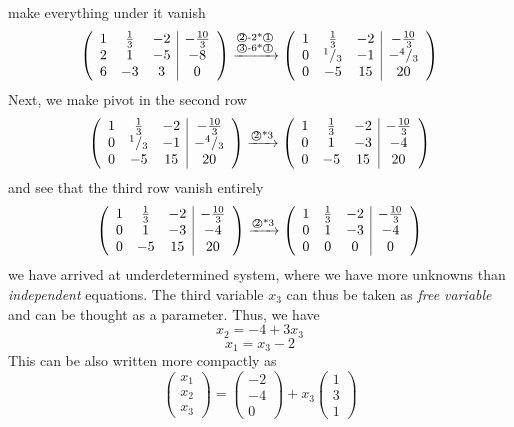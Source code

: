 \documentclass[8pt]{article} %
\begin{document}
\begin{enumerate}
{\[		\]
		make everything under it vanish
		\[\left(\begin{array}{ccc|c}1&\frac{1}{3}&-2&-\frac{10}{3}\\2&1&-5&-8\\6&-3&3&0\end{array}\right)\xrightarrow{\begin{subarray}{c}\text{\textcircled{2}-2*\textcircled{1}}\\\text{\textcircled{3}-6*\textcircled{1}}\end{subarray}}\left(\begin{array}{ccc|c}1&\frac{1}{3}&-2&-\frac{10}{3}\\0&^1/_3&-1&-^4/_3
			\\0&-5&15&20\end{array}\right)
		\]
		Next, we make pivot in the second row
		\[\left(\begin{array}{ccc|c}1&\frac{1}{3}&-2&-\frac{10}{3}\\0&^1/_3&-1&-^4/_3
			\\0&-5&15&20\end{array}\right)\xrightarrow{\text{\textcircled{2}*3}}\left(\begin{array}{ccc|c}1&\frac{1}{3}&-2&-\frac{10}{3}\\0&1&-3&-4\\0&-5&15&20\end{array}\right)
		\]
		and see that the third row vanish entirely
		\[\left(\begin{array}{ccc|c}1&\frac{1}{3}&-2&-\frac{10}{3}\\0&1&-3&-4\\0&-5&15&20\end{array}\right)\xrightarrow{\text{\textcircled{2}*3}}\left(\begin{array}{ccc|c}1&\frac{1}{3}&-2&-\frac{10}{3}\\0&1&-3&-4\\0&0&0&0\end{array}\right)
		\]
		we have arrived at underdetermined system, where we have more unknowns than {\it independent} equations.
		The third variable $x_3$ can thus be taken as {\it free variable} and can be thought as a parameter. Thus, we have
		\[x_2=-4+3x_3\]\[x_1=x_3-2\]
		This can be also written more compactly as
		\[\begin{pmatrix}x_1\\x_2\\x_3\end{pmatrix}=\begin{pmatrix}-2\\-4\\0\end{pmatrix}+x_3\begin{pmatrix}1\\3\\1\end{pmatrix}\]
		}
\end{enumerate}
\end{document}
